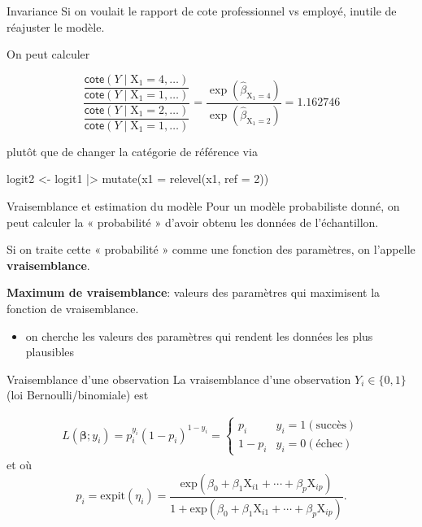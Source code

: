 \documentclass[
  ignorenonframetext,
]{beamer}
\newenvironment{Shaded}{\begin{snugshade}}{\end{snugshade}}
\newcommand{\AttributeTok}[1]{\textcolor[rgb]{0.40,0.45,0.13}{#1}}
\newcommand{\DecValTok}[1]{\textcolor[rgb]{0.68,0.00,0.00}{#1}}
\newcommand{\FunctionTok}[1]{\textcolor[rgb]{0.28,0.35,0.67}{#1}}
\newcommand{\NormalTok}[1]{\textcolor[rgb]{0.00,0.23,0.31}{#1}}
\newcommand{\OtherTok}[1]{\textcolor[rgb]{0.00,0.23,0.31}{#1}}
\newcommand{\SpecialCharTok}[1]{\textcolor[rgb]{0.37,0.37,0.37}{#1}}
\providecommand{\tightlist}{%
  \setlength{\itemsep}{0pt}\setlength{\parskip}{0pt}}\usepackage{longtable,booktabs,array}
\begin{document}
\begin{frame}[fragile]{Invariance}
\protect\hypertarget{invariance}{}
Si on voulait le rapport de cote professionnel vs employé, inutile de
réajuster le modèle.

On peut calculer

\[ 
\dfrac{\dfrac{\mathsf{cote}(Y \mid \mathrm{X}_{1}=4, \ldots)}{\mathsf{cote}(Y \mid \mathrm{X}_{1}=1, \ldots)}}{\dfrac{\mathsf{cote}(Y \mid \mathrm{X}_{1}=2, \ldots)}{\mathsf{cote}(Y \mid \mathrm{X}_{1}=1, \ldots)}} = \frac{\exp(\widehat{\beta}_{\mathrm{X}_{1}=4})}{\exp(\widehat{\beta}_{\mathrm{X}_{1}=2})} =1.162746
\]

plutôt que de changer la catégorie de référence via

\begin{Shaded}
\begin{Highlighting}[numbers=left,,]
\NormalTok{logit2 }\OtherTok{\textless{}{-}}\NormalTok{ logit1 }\SpecialCharTok{|\textgreater{}} 
   \FunctionTok{mutate}\NormalTok{(}\AttributeTok{x1 =} \FunctionTok{relevel}\NormalTok{(x1, }\AttributeTok{ref =} \DecValTok{2}\NormalTok{))}
\end{Highlighting}
\end{Shaded}
\end{frame}

\begin{frame}{Vraisemblance et estimation du modèle}
\protect\hypertarget{vraisemblance-et-estimation-du-moduxe8le}{}
Pour un modèle probabiliste donné, on peut calculer la « probabilité »
d'avoir obtenu les données de l'échantillon.

Si on traite cette « probabilité » comme une fonction des paramètres, on
l'appelle \textbf{vraisemblance}.

\textbf{Maximum de vraisemblance}: valeurs des paramètres qui maximisent
la fonction de vraisemblance.

\begin{itemize}
\tightlist
\item
  on cherche les valeurs des paramètres qui rendent les données les plus
  plausibles
\end{itemize}
\end{frame}

\begin{frame}{Vraisemblance d'une observation}
\protect\hypertarget{vraisemblance-dune-observation}{}
La vraisemblance d'une observation \(Y_i \in \{0,1\}\) (loi
Bernoulli/binomiale) est

\begin{align*}
L(\boldsymbol{\beta}; y_i) = p_i^{y_i}(1-p_i)^{1-y_i} = \begin{cases} 
p_i & y_i = 1 (\text{succès})\\
1-p_i & y_i = 0 (\text{échec}) 
\end{cases}
\end{align*} et où
\[p_i = \mathrm{expit}(\eta_i) = \frac{\mathrm{exp}(\beta_0 + \beta_1 \mathrm{X}_{i1} + \cdots + \beta_p\mathrm{X}_{ip})}{1+\mathrm{exp}(\beta_0 + \beta_1 \mathrm{X}_{i1} + \cdots + \beta_p\mathrm{X}_{ip})}.\]
\end{frame}
\end{document}
